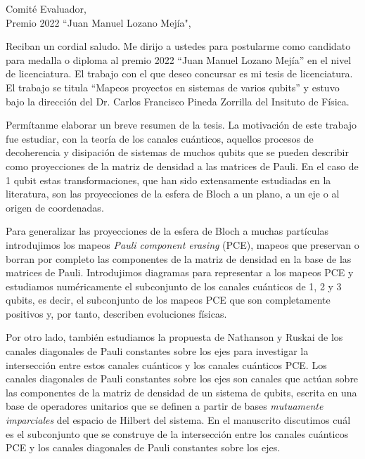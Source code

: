 \documentclass[letterpaper, 11pt]{letter}
\date{Ciudad de México, \today}
\begin{document}
\begin{letter}
{}

\opening{
Comité Evaluador,\\
Premio 2022 ``Juan Manuel Lozano Mejía",\\
}


Reciban un cordial saludo. Me dirijo a ustedes para postularme como candidato
para medalla o diploma al premio 2022 ``Juan Manuel Lozano Mejía'' en el nivel
de licenciatura. El trabajo con el que deseo concursar es mi tesis de 
licenciatura. El trabajo se titula ``Mapeos proyectos en sistemas de varios qubits'' y
estuvo bajo la dirección del Dr. Carlos Francisco Pineda Zorrilla del Insituto
de Física. 

Permítanme elaborar un breve resumen de la tesis.
La motivación de este trabajo fue estudiar, con la teoría 
de los canales cuánticos, aquellos procesos  
de decoherencia y disipación de sistemas de muchos qubits que se pueden describir 
como proyecciones de la matriz de densidad a las matrices de Pauli. 
En el caso de 1 qubit estas transformaciones, que han sido extensamente estudiadas en la literatura, son las proyecciones de la esfera de Bloch a un plano,
a un eje o al origen de coordenadas. 

Para generalizar las proyecciones de la esfera de Bloch
a muchas partículas introdujimos 
los mapeos \textit{Pauli component erasing} (PCE), mapeos que preservan o borran
por completo las componentes de la matriz de densidad en la base de las 
matrices de Pauli. Introdujimos diagramas para representar a los mapeos 
PCE y estudiamos numéricamente 
el subconjunto de los canales cuánticos de 1, 2 y 3 qubits, es decir, 
el subconjunto de los mapeos PCE que son completamente positivos y, por tanto,
describen evoluciones físicas.

Por otro lado, también estudiamos la propuesta de Nathanson y Ruskai de los 
canales diagonales de Pauli constantes sobre los ejes para investigar la 
intersección entre estos canales cuánticos y los canales cuánticos PCE.
Los canales diagonales de Pauli constantes sobre los
ejes son canales que actúan sobre las componentes de la matriz de densidad
de un sistema de qubits, escrita en una base de operadores unitarios que
se definen a partir de bases \textit{mutuamente imparciales} del espacio de Hilbert del sistema. En el manuscrito
discutimos cuál es el subconjunto que se construye de la intersección entre 
los canales cuánticos PCE y los canales diagonales de Pauli constantes sobre 
los ejes. 


\end{letter}
\end{document}
